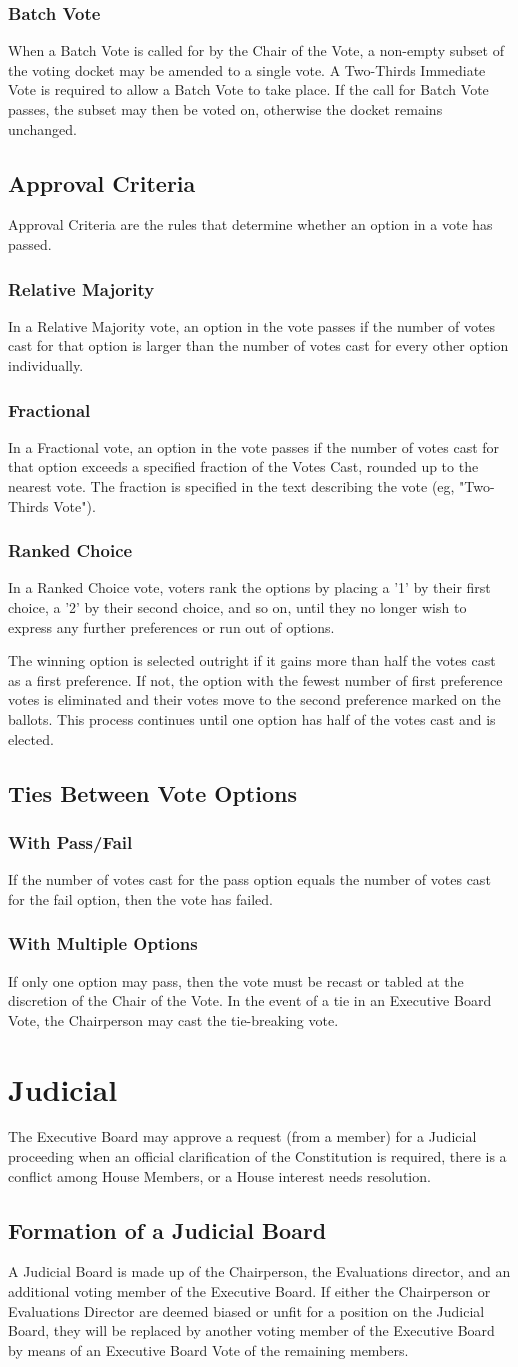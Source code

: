 \documentclass{article}
\newcommand{\article}[1]{\section{#1} \label{#1}}
\newcommand{\asection}[1]{\subsection{#1} \label{#1}}
\newcommand{\asubsection}[1]{\subsubsection{#1} \label{#1}}
\begin{document}
\asubsection{Batch Vote}
When a Batch Vote is called for by the Chair of the Vote, a non-empty subset of the voting docket may be amended to a single vote.
A Two-Thirds Immediate Vote is required to allow a Batch Vote to take place.
If the call for Batch Vote passes, the subset may then be voted on, otherwise the docket remains unchanged.

\asection{Approval Criteria}
Approval Criteria are the rules that determine whether an option in a vote has passed.
\asubsection{Relative Majority}
In a Relative Majority vote, an option in the vote passes if the number of votes cast for that option is larger than the number of votes cast for every other option individually.
\asubsection{Fractional}
In a Fractional vote, an option in the vote passes if the number of votes cast for that option exceeds a specified fraction of the Votes Cast, rounded up to the nearest vote.
The fraction is specified in the text describing the vote (eg, "Two-Thirds Vote").
\asubsection{Ranked Choice}
In a Ranked Choice vote, voters rank the options by placing a '1' by their first choice, a '2' by their second choice, and so on, until they no longer wish to express any further preferences or run out of options.

The winning option is selected outright if it gains more than half the votes cast as a first preference.
If not, the option with the fewest number of first preference votes is eliminated and their votes move to the second preference marked on the ballots.
This process continues until one option has half of the votes cast and is elected.

\asection{Ties Between Vote Options}

\asubsection{With Pass/Fail}
If the number of votes cast for the pass option equals the number of votes cast for the fail option, then the vote has failed.

\asubsection{With Multiple Options}
If only one option may pass, then the vote must be recast or tabled at the discretion of the Chair of the Vote.
In the event of a tie in an Executive Board Vote, the Chairperson may cast the tie-breaking vote.

\article{Judicial}
The Executive Board may approve a request (from a member) for a Judicial proceeding when an official clarification of the Constitution is required, there is a conflict among House Members, or a House interest needs resolution.
\asection{Formation of a Judicial Board}
A Judicial Board is made up of the Chairperson, the Evaluations director, and an additional voting member of the Executive Board.
If either the Chairperson or Evaluations Director are deemed biased or unfit for a position on the Judicial Board, they will be replaced by another voting member of the Executive Board by means of an Executive Board Vote of the remaining members.
\end{document}
